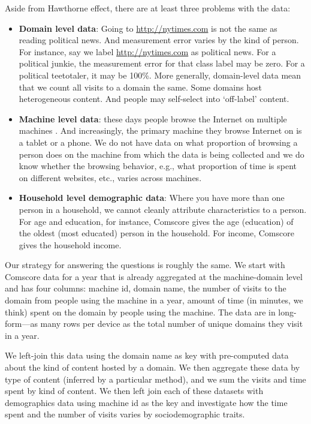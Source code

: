 \documentclass[12pt, letterpaper]{article}
\begin{document}
Aside from Hawthorne effect, there are at least three problems with the data:
\begin{itemize}
  \item \textbf{Domain level data}: Going to \url{http://nytimes.com} is not the same as reading political news. And measurement error varies by the kind of person. For instance, say we label \url{http://nytimes.com} as political news. For a political junkie, the measurement error for that class label may be zero. For a political teetotaler, it may be 100\%. More generally, domain-level data mean that we count all visits to a domain the same. Some domains host heterogeneous content. And people may self-select into `off-label' content.

  \item \textbf{Machine level data}: these days people browse the Internet on multiple machines \citep{deloitte2019}. And increasingly, the primary machine they browse Internet on is a tablet or a phone. We do not have data on what proportion of browsing a person does on the machine from which the data is being collected and we do know whether the browsing behavior, e.g., what proportion of time is spent on different websites, etc., varies across machines.

  \item \textbf{Household level demographic data}: Where you have more than one person in a household, we cannot cleanly attribute characteristics to a person. For age and education, for instance, Comscore gives the age (education) of the oldest (most educated) person in the household. For income, Comscore gives the household income.
\end{itemize}

Our strategy for answering the questions is roughly the same. We start with Comscore data for a year that is already aggregated at the machine-domain level and has four columns: machine id, domain name, the number of visits to the domain from people using the machine in a year, amount of time (in minutes, we think) spent on the domain by people using the machine. The data are in long-form---as many rows per device as the total number of unique domains they visit in a year.

We left-join this data using the domain name as key with pre-computed data about the kind of content hosted by a domain. We then aggregate these data by type of content (inferred by a particular method), and we sum the visits and time spent by kind of content. We then left join each of these datasets with demographics data using machine id as the key and investigate how the time spent and the number of visits varies by sociodemographic traits.
\end{document}
